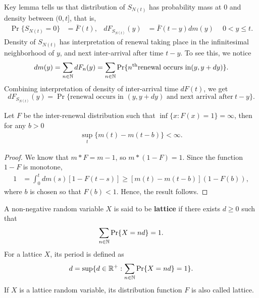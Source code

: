 \documentclass[a4paper,10pt,english]{article}
\begin{document}
\begin{shaded*}
Key lemma tells us that distribution of $S_{N(t)}$ has probability mass at $0$ and density between $(0,t]$, that is,
\begin{align*}
\Pr\{S_{N(t)}=0\}&=\bar{F}(t),& dF_{S_{N(t)}}(y)&=\bar{F}(t-y)dm(y)~\quad 0 < y \leq t.
\end{align*}
Density of $S_{N(t)}$ has interpretation of renewal taking place in the infinitesimal neighborhood of $y$, and next inter-arrival after time $t-y$. To see this, we notice 
\begin{equation*}
dm(y)=\sum_{n \in \mathbb{N}}dF_n(y) =\sum_{n \in \mathbb{N}}\Pr\{n^{\text{th}} \text{renewal occurs in} (y,y+dy)\}.
\end{equation*}
Combining interpretation of density of inter-arrival time $dF(t)$, we get
\begin{equation*}
dF_{S_{N(t)}}(y)=\Pr\{\text{renewal occurs in }(y,y+dy) \text{ and next arrival after}~ t-y\}.
\end{equation*}
\end{shaded*}

\begin{lem} 
Let $F$ be the inter-renewal distribution such that $\inf\{x: F(x) = 1\} = \infty$, then for any $b > 0$ 
\begin{align*}
\sup_{t} \{m(t)-m(t-b) \}< \infty.
\end{align*} 
\end{lem}
\begin{proof}
We know that $m \ast F = m - 1$, so $m \ast (1- F) = 1$. 
Since the function $1-F$ is monotone, 
\begin{align*}
1 &= \int_0^tdm(s)[1-F(t-s)] \geq [m(t) - m(t-b)](1-F(b)),
\end{align*}
where $b$ is chosen so that $F(b) < 1$. Hence, the result follows. 
\end{proof}

A non-negative random variable $X$ is said to be \textbf{lattice} if there exists $d \geq 0$ such that 
\begin{equation*}
\sum_{n\in\mathbb{N}}\Pr\{X = nd\} = 1.
\end{equation*}
For a lattice $X$, its period is defined as 
\begin{equation*}
d = \sup\{ d \in\mathbb{R}^+: \sum_{n\in\mathbb{N}}\Pr\{X = nd\} = 1 \}.
\end{equation*}
If $X$ is a lattice random variable, its distribution function $F$ is also called lattice.
\end{document}
